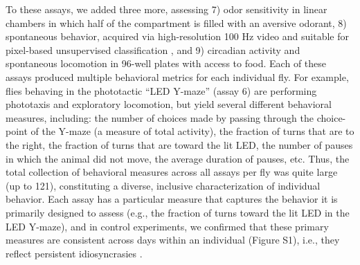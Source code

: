 \documentclass[12pt,letterpaper]{article}
\begin{document}
To these assays, we added three more, assessing 7) odor sensitivity in linear chambers \cite{Claridge-Chang_Writing_2009} in which half of the compartment is filled with an aversive odorant, 8) spontaneous behavior, acquired via high-resolution 100 Hz video and suitable for pixel-based unsupervised classification \cite{berman_choi_bialek_shaevitz_2014}, and 9) circadian activity and spontaneous locomotion in 96-well plates with access to food. Each of these assays produced multiple behavioral metrics for each individual fly. For example, flies behaving in the phototactic “LED Y-maze” (assay 6) are performing phototaxis and exploratory locomotion, but yield several different behavioral measures, including: the number of choices made by passing through the choice-point of the Y-maze (a measure of total activity), the fraction of turns that are to the right, the fraction of turns that are toward the lit LED, the number of pauses in which the animal did not move, the average duration of pauses, etc. Thus, the total collection of behavioral measures across all assays per fly was quite large (up to 121), constituting a diverse, inclusive characterization of individual behavior. Each assay has a particular measure that captures the behavior it is primarily designed to assess (e.g., the fraction of turns toward the lit LED in the LED Y-maze), and in control experiments, we confirmed that these primary measures are consistent across days within an individual (Figure S1), i.e., they reflect persistent idiosyncrasies \cite{Kain_Phototactic_2012,Buchanan_Neuronal_2015,Kain_Variability_2015}.
\end{document}
